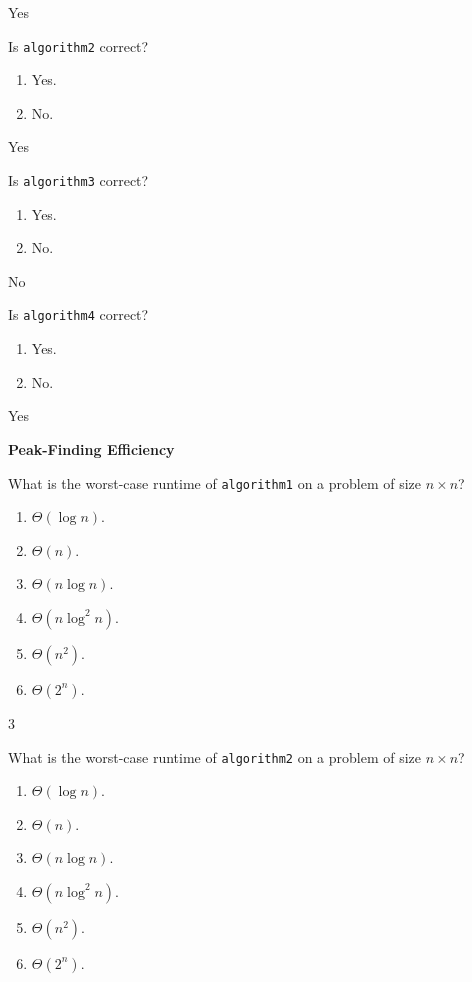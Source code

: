 \documentclass[12pt,twoside]{article}
\begin{document}
\begin{problems}
\begin{problemparts}
\ifsolution \solution{}
Yes
\fi

\problempart {} Is \texttt{algorithm2} correct?
\begin{enumerate}
\item Yes.
\item No.
\end{enumerate}

\ifsolution \solution{}
Yes
\fi

\problempart {} Is \texttt{algorithm3} correct?
\begin{enumerate}
\item Yes.
\item No.
\end{enumerate}

\ifsolution \solution{}
No
\fi

\problempart {} Is \texttt{algorithm4} correct?
\begin{enumerate}
\item Yes.
\item No.
\end{enumerate}

\ifsolution \solution{}
Yes
\fi

\end{problemparts}

\problem {} \textbf{Peak-Finding Efficiency}

\begin{problemparts}

\problempart {} What is the worst-case runtime of \texttt{algorithm1} on a problem of size $n \times n$?
\begin{enumerate}
\item $\Theta(\log n)$.
\item $\Theta(n)$.
\item $\Theta(n \log n)$.
\item $\Theta(n \log^2 n)$.
\item $\Theta(n^2)$.
\item $\Theta(2^n)$.
\end{enumerate}

\ifsolution \solution{}
3
\fi

\problempart {} What is the worst-case runtime of \texttt{algorithm2} on a problem of size $n \times n$?
\begin{enumerate}
\item $\Theta(\log n)$.
\item $\Theta(n)$.
\item $\Theta(n \log n)$.
\item $\Theta(n \log^2 n)$.
\item $\Theta(n^2)$.
\item $\Theta(2^n)$.
\end{enumerate}


\end{problemparts}
\end{problems}
\end{document}
